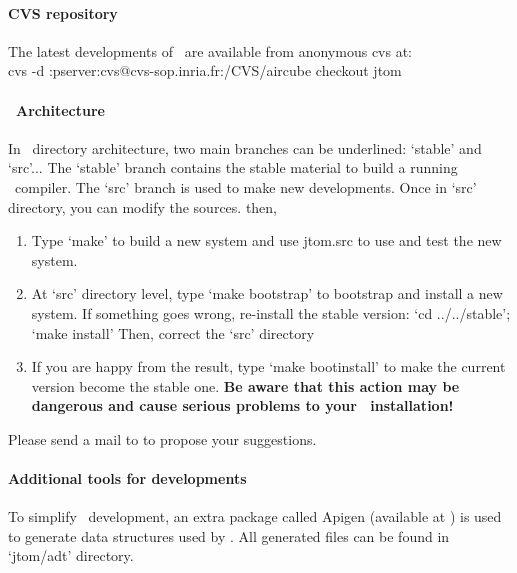 \paragraph{CVS repository}
The latest developments of \TOM\ are available from anonymous cvs at:
\\cvs -d :pserver:cvs@cvs-sop.inria.fr:/CVS/aircube checkout jtom
\paragraph{\TOM\ Architecture}
In \TOM\ directory architecture, two main branches can be underlined:
`stable' and `src'...
The `stable' branch contains the stable material to build a running
\TOM\ compiler. The `src' branch is used to make new developments.
Once in `src' directory, you can modify the sources. then, 
\begin{enumerate}
\item Type `make' to build a new system and use jtom.src to use and
  test the new system.
\item At `src' directory level, type `make bootstrap' to bootstrap and
  install a new system.
  If something goes wrong, re-install the stable version:
  `cd ../../stable'; `make install'
  Then, correct the `src' directory
\item If you are happy from the result, type `make bootinstall' to
  make the current version become the stable one.   
  \textbf{Be aware that this action may be dangerous and cause serious
  problems to your \TOM\ installation!}
\end{enumerate}
Please send a mail to  to propose your
suggestions.

\paragraph{Additional tools for developments}
To simplify \TOM\ development, an extra package called Apigen 
(available at ) 
is used to generate data structures used by \TOM. All generated files
can be found in `jtom/adt' directory.
